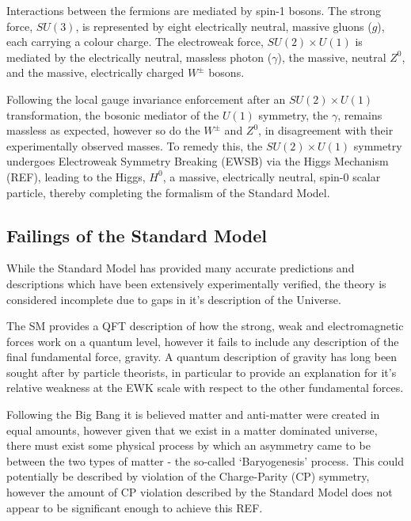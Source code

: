 Interactions between the fermions are mediated by spin-1 bosons. The strong 
force, $SU(3)$, is represented by eight electrically neutral, massive gluons 
($g$), each carrying a colour charge. The electroweak force, $SU(2)\times U(1)$
is
mediated by the electrically neutral, massless photon ($\gamma$), the massive,
neutral $Z^0$, and the massive, electrically charged $W^{\pm}$ bosons.

Following the local gauge invariance enforcement after an $SU(2)\times U(1)$
transformation,
the bosonic mediator of the $U(1)$ symmetry, the $\gamma$, remains massless as
expected, however so do the $W^{\pm}$ and $Z^0$, in disagreement with their
experimentally observed masses. To remedy this, the $SU(2)\times U(1)$ symmetry
undergoes Electroweak Symmetry Breaking (EWSB) via the Higgs Mechanism (REF), 
leading to the Higgs, $H^0$, a massive, electrically neutral, spin-0
scalar particle, thereby completing the formalism of the Standard Model.



\subsection{Failings of the Standard Model}

While the Standard Model has provided many accurate predictions and descriptions
which have been extensively experimentally verified, the theory is considered
incomplete due to gaps in it's description of the Universe.

The SM provides a QFT description of how the strong, weak and electromagnetic
forces work on a quantum level, however it fails to include any description of
the final fundamental force, gravity. A quantum description of gravity has long
been sought after by particle theorists, in particular to provide an explanation
for it's relative weakness at the EWK scale with respect to the other
fundamental forces.

Following the Big Bang it is believed matter and anti-matter were created in
equal amounts, however given that we exist in a matter dominated universe, there
must exist some physical process by which an asymmetry came to be between the
two types of matter - the so-called `Baryogenesis' process. This could
potentially be described by violation of the Charge-Parity (CP) symmetry,
however the amount of CP violation described by the Standard Model
does not appear to be significant enough to achieve this REF.

